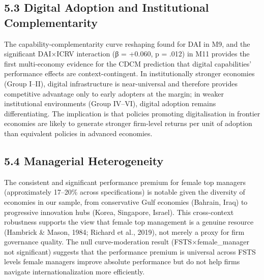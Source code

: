 \documentclass[
  12pt]{article}
\begin{document}
\hypertarget{digital-adoption-and-institutional-complementarity}{%
\subsection{5.3 Digital Adoption and Institutional
Complementarity}\label{digital-adoption-and-institutional-complementarity}}

The capability-complementarity curve reshaping found for DAI in M9, and
the significant DAI×ICRV interaction (β = +0.060, p = .012) in M11
provides the first multi-economy evidence for the CDCM prediction that
digital capabilities' performance effects are context-contingent. In
institutionally stronger economies (Group I--II), digital infrastructure
is near-universal and therefore provides competitive advantage only to
early adopters at the margin; in weaker institutional environments
(Group IV--VI), digital adoption remains differentiating. The
implication is that policies promoting digitalisation in frontier
economies are likely to generate stronger firm-level returns per unit of
adoption than equivalent policies in advanced economies.

\hypertarget{managerial-heterogeneity}{%
\subsection{5.4 Managerial
Heterogeneity}\label{managerial-heterogeneity}}

The consistent and significant performance premium for female top
managers (approximately 17--20\% across specifications) is notable given
the diversity of economies in our sample, from conservative Gulf
economies (Bahrain, Iraq) to progressive innovation hubs (Korea,
Singapore, Israel). This cross-context robustness supports the view that
female top management is a genuine resource (Hambrick \& Mason, 1984;
Richard et al., 2019), not merely a proxy for firm governance quality.
The null curve-moderation result (FSTS×female\_manager not significant)
suggests that the performance premium is universal across FSTS levels
female managers improve absolute performance but do not help firms
navigate internationalization more efficiently.
\end{document}
